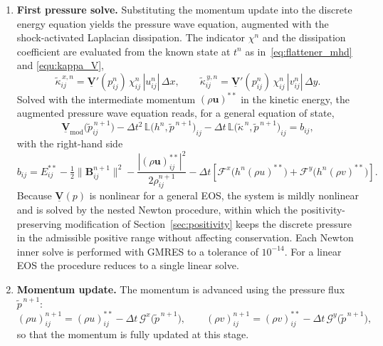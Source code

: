 \documentclass[a4paper,fleqn]{cas-sc}
\theoremstyle{definition}
\theoremstyle{remark}
\begin{document}
\begin{enumerate}
\item \textbf{First pressure solve.}
Substituting the momentum update into the discrete energy equation yields the
pressure wave equation, augmented with the shock-activated Laplacian dissipation.
The indicator $\chi^{n}$ and the dissipation coefficient are evaluated from the
known state at $t^{n}$ as in~\eqref{eq:flattener_mhd} and \eqref{equ:kappa_V},
\begin{equation}
\tilde{\kappa}^{\,x,n}_{ij}
 = \underline{\mathbf{V}}'(p^{n}_{ij})\,\chi^{n}_{ij}\,|u^{n}_{ij}|\,\Delta x,
\qquad
\tilde{\kappa}^{\,y,n}_{ij}
 = \underline{\mathbf{V}}'(p^{n}_{ij})\,\chi^{n}_{ij}\,|v^{n}_{ij}|\,\Delta y.
\end{equation}
Solved with the intermediate momentum $(\rho\mathbf{u})^{**}$ in the kinetic
energy, the augmented pressure wave equation reads, for a general equation of
state,
\begin{equation}
\label{eq:fd_pressurefirst}
\underline{\mathbf{V}}_{\mathrm{mod}}\bigl(\tilde p^{\,n+1}_{ij}\bigr)
 - \Delta t^{2}\,\mathbb{L}\bigl(h^{n},\tilde p^{\,n+1}\bigr)_{ij}
 - \Delta t\,\mathbb{L}\bigl(\tilde{\kappa}^{\,n},\tilde p^{\,n+1}\bigr)_{ij}
 = b_{ij},
\end{equation}
with the right-hand side
\begin{equation}
b_{ij} = E^{**}_{ij} - \tfrac{1}{2}\|\mathbf{B}^{n+1}_{ij}\|^{2}
- \frac{|(\rho\mathbf{u})^{**}_{ij}|^{2}}{2\rho^{n+1}_{ij}}
- \Delta t\left[\mathcal{F}^{x}\!\big(h^{n}(\rho u)^{**}\big)
+ \mathcal{F}^{y}\!\big(h^{n}(\rho v)^{**}\big)\right].
\end{equation}
Because $\underline{\mathbf{V}}(p)$ is nonlinear for a general EOS, the system is
mildly nonlinear and is solved by the nested Newton procedure, within which the positivity-preserving
modification of Section~\ref{sec:positivity} keeps the discrete pressure in the
admissible positive range without affecting conservation. Each Newton inner solve
is performed with GMRES to a tolerance of $10^{-14}$. For a linear EOS the
procedure reduces to a single linear solve.

\item \textbf{Momentum update.}
The momentum is advanced using the pressure flux $\tilde{p}^{\,n+1}$:
\begin{equation}
(\rho u)_{ij}^{n+1}=(\rho u)_{ij}^{**}-\Delta t\,\mathcal{G}^{x}\!\big(\tilde{p}^{\,n+1}\big),
\qquad
(\rho v)_{ij}^{n+1}=(\rho v)_{ij}^{**}-\Delta t\,\mathcal{G}^{y}\!\big(\tilde{p}^{\,n+1}\big),
\end{equation}
so that the momentum is fully updated at this stage.


\end{enumerate}
\end{document}
